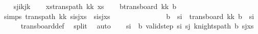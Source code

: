 \begin{isabellebody}
\ \ \isamarkupfalse%
\ {\isacharquery}{\kern0pt}s\isactrlsub j{\isacharequal}{\kern0pt}{\isachardoublequoteopen}{\isacharparenleft}{\kern0pt}i{\isacharprime}{\kern0pt}{\isacharplus}{\kern0pt}kj{\isacharprime}{\kern0pt}{\isacharplus}{\kern0pt}k\isanewline
\ \ \isamarkupfalse%
\ {\isacharquery}{\kern0pt}xs{\isacharequal}{\kern0pt}{\isachardoublequoteopen}trans{\isacharunderscore}{\kern0pt}path\ {\isacharparenleft}{\kern0pt}kk\ xs{\isachardoublequoteclose}\isanewline
\ \ \isamarkupfalse%
\ {\isacharquery}{\kern0pt}b{\isacharequal}{\kern0pt}{\isachardoublequoteopen}trans{\isacharunderscore}{\kern0pt}board\ {\isacharparenleft}{\kern0pt}kk\ b{\isachardoublequoteclose}\isanewline
\ \ \isamarkupfalse%
\ simps{\isacharcolon}{\kern0pt}\ {\isachardoublequoteopen}trans{\isacharunderscore}{\kern0pt}path\ {\isacharparenleft}{\kern0pt}kk\ {\isacharparenleft}{\kern0pt}s\isactrlsub i{\isacharhash}{\kern0pt}s\isactrlsub j{\isacharhash}{\kern0pt}xs{\isacharparenright}{\kern0pt}\ {\isacharequal}{\kern0pt}\ {\isacharquery}{\kern0pt}s\isactrlsub i{\isacharhash}{\kern0pt}{\isacharquery}{\kern0pt}s\isactrlsub j{\isacharhash}{\kern0pt}{\isacharquery}{\kern0pt}xs{\isachardoublequoteclose}\ \isanewline
\ \ \ \ \ \ \ \ \ \ \ \ \ \ {\isachardoublequoteopen}{\isacharquery}{\kern0pt}b\ {\isasymunion}\ {\isacharbraceleft}{\kern0pt}{\isacharquery}{\kern0pt}s\isactrlsub i{\isacharbraceright}{\kern0pt}\ {\isacharequal}{\kern0pt}\ trans{\isacharunderscore}{\kern0pt}board\ {\isacharparenleft}{\kern0pt}kk\ {\isacharparenleft}{\kern0pt}b\ {\isasymunion}\ {\isacharbraceleft}{\kern0pt}s\isactrlsub i{\isacharbraceright}{\kern0pt}{\isacharparenright}{\kern0pt}{\isachardoublequoteclose}\isanewline
\ \ \ \ \isamarkupfalse%
\ trans{\isacharunderscore}{\kern0pt}board{\isacharunderscore}{\kern0pt}def\ \isamarkupfalse%
\ split\ \isamarkupfalse%
\ auto\isanewline
\ \ \isamarkupfalse%
\ {\isachardoublequoteopen}{\isacharquery}{\kern0pt}s\isactrlsub i\ {\isasymnotin}\ {\isacharquery}{\kern0pt}b{\isachardoublequoteclose}\ {\isachardoublequoteopen}valid{\isacharunderscore}{\kern0pt}step\ {\isacharquery}{\kern0pt}s\isactrlsub i\ {\isacharquery}{\kern0pt}s\isactrlsub j{\isachardoublequoteclose}\ {\isachardoublequoteopen}knights{\isacharunderscore}{\kern0pt}path\ {\isacharquery}{\kern0pt}b\ {\isacharparenleft}{\kern0pt}{\isacharquery}{\kern0pt}s\isactrlsub j{\isacharhash}{\kern0pt}{\isacharquery}{\kern0pt}xs{\isacharparenright}{\kern0pt}{\isachardoublequoteclose}\isanewline

\end{isabellebody}
